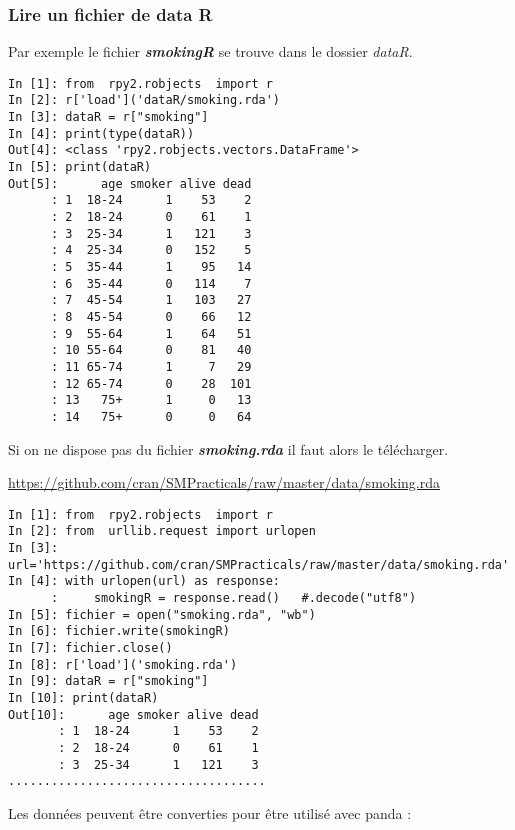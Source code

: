 \documentclass[10pt,dvipsnames, dvips, svgnames]{article}
\begin{document}
\subsubsection{Lire un fichier de data R}

Par exemple le fichier \textbf{\textit{smokingR}} se trouve dans le dossier \textit{dataR}.

\begin{lstlisting}
In [1]: from  rpy2.robjects  import r
In [2]: r['load']('dataR/smoking.rda')
In [3]: dataR = r["smoking"]
In [4]: print(type(dataR))
Out[4]: <class 'rpy2.robjects.vectors.DataFrame'>
In [5]: print(dataR)
Out[5]:      age smoker alive dead
      : 1  18-24      1    53    2
      : 2  18-24      0    61    1
      : 3  25-34      1   121    3
      : 4  25-34      0   152    5
      : 5  35-44      1    95   14
      : 6  35-44      0   114    7
      : 7  45-54      1   103   27
      : 8  45-54      0    66   12
      : 9  55-64      1    64   51
      : 10 55-64      0    81   40
      : 11 65-74      1     7   29
      : 12 65-74      0    28  101
      : 13   75+      1     0   13
      : 14   75+      0     0   64
\end{lstlisting}

Si on ne dispose pas du fichier \textit{\textbf{smoking.rda}} il faut alors le télécharger.

\url{https://github.com/cran/SMPracticals/raw/master/data/smoking.rda}

\begin{lstlisting}
In [1]: from  rpy2.robjects  import r
In [2]: from  urllib.request import urlopen
In [3]: url='https://github.com/cran/SMPracticals/raw/master/data/smoking.rda'
In [4]: with urlopen(url) as response:
      :     smokingR = response.read()   #.decode("utf8")
In [5]: fichier = open("smoking.rda", "wb")
In [6]: fichier.write(smokingR)
In [7]: fichier.close()
In [8]: r['load']('smoking.rda')
In [9]: dataR = r["smoking"]
In [10]: print(dataR)
Out[10]:      age smoker alive dead
       : 1  18-24      1    53    2
       : 2  18-24      0    61    1
       : 3  25-34      1   121    3
....................................
       \end{lstlisting}


Les données peuvent être converties  pour être utilisé avec  panda :


\end{document}
